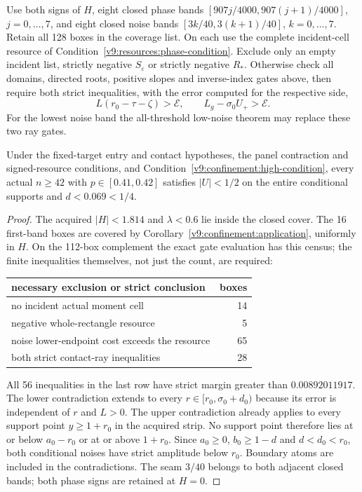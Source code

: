 \begin{condition}
\label{v9:confinement:high-condition}
Use both signs of $H$, eight closed phase bands
$[907j/4000,907(j+1)/4000]$, $j=0,\ldots,7$, and eight closed noise
bands $[3k/40,3(k+1)/40]$, $k=0,\ldots,7$.
Retain all 128 boxes in the coverage list. On each use the complete
incident-cell resource of Condition~\ref{v9:resources:phase-condition}.
Exclude only an empty incident list, strictly negative $S_\varepsilon$
or strictly negative $R_*$. Otherwise check all domains, directed roots,
positive slopes and inverse-index gates above, then require both strict
inequalities, with the error computed for the respective side,
\begin{equation}\label{v9:confinement:strict-gates}
 L(r_0-\tau-\zeta)>\mathcal E,\qquad
 L_g-\sigma_0U_+>\mathcal E.
\end{equation}
For the lowest noise band the all-threshold low-noise theorem may
replace these two ray gates.
\end{condition}

\begin{theorem}
\label{v9:confinement:central}
Under the fixed-target entry and contact hypotheses, the panel
contraction and signed-resource conditions, and
Condition~\ref{v9:confinement:high-condition}, every actual $n\ge42$ with
$p\in[0.41,0.42]$ satisfies $|U|<1/2$ on the entire conditional
supports and $d<0.069<1/4$.
\end{theorem}
\begin{proof}
The acquired $|H|<1.814$ and $\lambda<0.6$ lie inside the closed cover.
The 16 first-band boxes are covered by
Corollary~\ref{v9:confinement:application}, uniformly in $H$.
On the 112-box complement the exact gate evaluation has this census;
the finite inequalities themselves, not just the count, are required:
\begin{center}
\begin{tabular}{lr}\toprule
necessary exclusion or strict conclusion&boxes\\\midrule
no incident actual moment cell&14\\
negative whole-rectangle resource&5\\
noise lower-endpoint cost exceeds the resource&65\\
both strict contact-ray inequalities&28\\\bottomrule
\end{tabular}
\end{center}
All 56 inequalities in the last row have strict margin greater than
$0.00892011917$. The lower contradiction extends to every
$r\in[r_0,\sigma_0+d_0)$ because its error is independent of $r$ and
$L>0$. The upper contradiction already applies to every support point
$y\ge1+r_0$ in the acquired strip. No support point therefore lies at
or below $a_0-r_0$ or at or above $1+r_0$. Since $a_0\ge0$,
$b_0\ge1-d$ and $d<d_0<r_0$, both conditional noises have strict
amplitude below $r_0$. Boundary atoms are included in the contradictions.
The seam $3/40$ belongs to both adjacent closed bands; both phase signs
are retained at $H=0$.
\end{proof}

